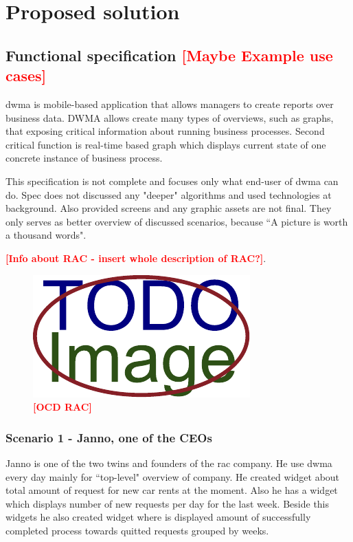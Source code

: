 \documentclass[thesis=B,english]{FITthesis}[2012/06/26]
\newcommand{\todo}[1]{\textcolor{red}{\textbf{[#1]}}}
\begin{document}
\chapter{Proposed solution}

	\section{Functional specification \todo{Maybe Example use cases}}    
   \gls{dwma} is mobile-based application that allows managers to create reports over business data. DWMA allows create many types of overviews, such as graphs, that exposing critical information about running business processes. Second critical function is real-time based graph which displays current state of one concrete instance of business process. 
    
	This specification  is not complete and focuses only what end-user of \gls{dwma} can do. Spec does not discussed any "deeper" algorithms and used technologies at background.
Also provided screens and any graphic assets are not final. They only serves as better overview of discussed scenarios, because ``A picture is worth a thousand words".

	\todo{Info about RAC - insert whole description of RAC?}. 
    
    \begin{figure}[h]
          \centering
          \includegraphics{img/TODO-image}
          \caption{\todo{OCD RAC}}
      \end{figure}   
    
    
	\subsection{Scenario 1 - Janno, one of the CEOs}    
    Janno is one of the two twins and founders of the \gls{rac} company. He use \gls{dwma} every day mainly for ``top-level" overview of company. He created widget about total amount of request for new car rents at the moment. Also he has a widget which displays number of new requests per day for the last week. Beside this widgets he also created widget where is displayed amount of successfully completed process towards quitted requests grouped by weeks.
    
\end{document}
